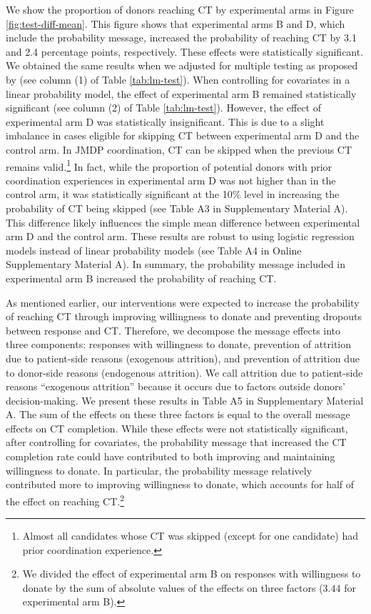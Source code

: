 \documentclass[12pt, a4paper]{article}
\begin{document}
We show the proportion of donors reaching CT by experimental arms in Figure \ref{fig:test-diff-mean}. This figure shows that experimental arms B and D, which include the probability message, increased the probability of reaching CT by 3.1 and 2.4 percentage points, respectively. These effects were statistically significant. We obtained the same results when we adjusted for multiple testing as proposed by \citet{List2019} (see column (1) of Table \ref{tab:lm-test}). When controlling for covariates in a linear probability model, the effect of experimental arm B remained statistically significant (see column (2) of Table \ref{tab:lm-test}). However, the effect of experimental arm D was statistically insignificant. This is due to a slight imbalance in cases eligible for skipping CT between experimental arm D and the control arm. In JMDP coordination, CT can be skipped when the previous CT remains valid.\footnote{Almost all candidates whose CT was skipped (except for one candidate) had prior coordination experience.} In fact, while the proportion of potential donors with prior coordination experiences in experimental arm D was not higher than in the control arm, it was statistically significant at the 10\% level in increasing the probability of CT being skipped (see Table A3 in Supplementary Material A). This difference likely influences the simple mean difference between experimental arm D and the control arm. These results are robust to using logistic regression models instead of linear probability models (see Table A4 in Online Supplementary Material A). In summary, the probability message included in experimental arm B increased the probability of reaching CT.

As mentioned earlier, our interventions were expected to increase the probability of reaching CT through improving willingness to donate and preventing dropouts between response and CT. Therefore, we decompose the message effects into three components: responses with willingness to donate, prevention of attrition due to patient-side reasons (exogenous attrition), and prevention of attrition due to donor-side reasons (endogenous attrition). We call attrition due to patient-side reasons ``exogenous attrition'' because it occurs due to factors outside donors' decision-making. We present these results in Table A5 in Supplementary Material A. The sum of the effects on these three factors is equal to the overall message effects on CT completion. While these effects were not statistically significant, after controlling for covariates, the probability message that increased the CT completion rate could have contributed to both improving and maintaining willingness to donate. In particular, the probability message relatively contributed more to improving willingness to donate, which accounts for half of the effect on reaching CT.\footnote{We divided the effect of experimental arm B on responses with willingness to donate by the sum of absolute values of the effects on three factors (\(3.44\) for experimental arm B).}
\end{document}
